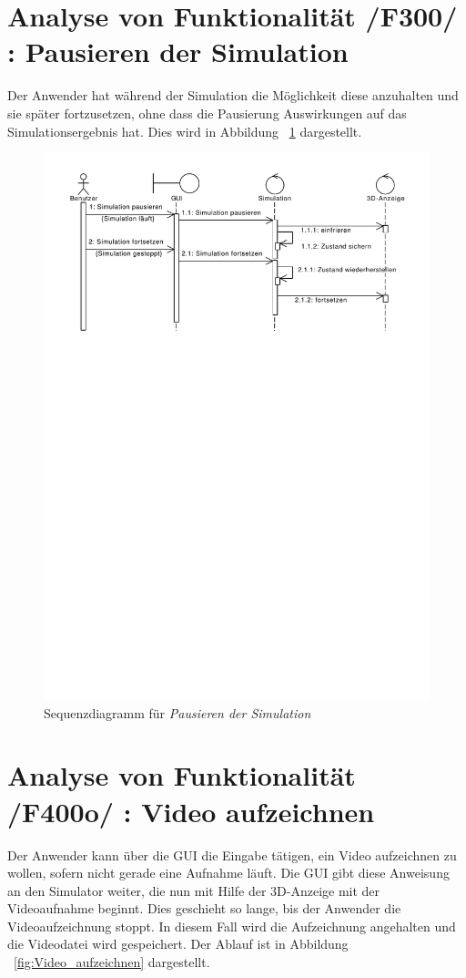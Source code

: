 \section{Analyse von Funktionalität /F300/ :  Pausieren der Simulation}
Der Anwender hat während der Simulation die Möglichkeit diese anzuhalten und sie später fortzusetzen, ohne dass die Pausierung Auswirkungen auf das Simulationsergebnis hat.
Dies wird in Abbildung ~\ref{fig:Pausieren} dargestellt.
\begin{figure}[!h]
\includegraphics[viewport = 0 17.5cm 25cm 30cm, width=\linewidth]{bilder/Pausieren.pdf}
\caption{Sequenzdiagramm für \textit{Pausieren der Simulation}}
\label{fig:Pausieren}
\end{figure}

\section{Analyse von Funktionalität /F400o/ :  Video aufzeichnen}
Der Anwender kann über die GUI die Eingabe tätigen, ein Video aufzeichnen zu wollen, sofern nicht gerade eine Aufnahme läuft. Die GUI gibt diese Anweisung an den Simulator weiter, die nun mit Hilfe der 3D-Anzeige mit der
Videoaufnahme beginnt. Dies geschieht so lange, bis der Anwender die Videoaufzeichnung stoppt. In diesem Fall wird die Aufzeichnung angehalten und die Videodatei wird gespeichert. Der Ablauf ist in Abbildung ~\ref{fig:Video_aufzeichnen} dargestellt.

